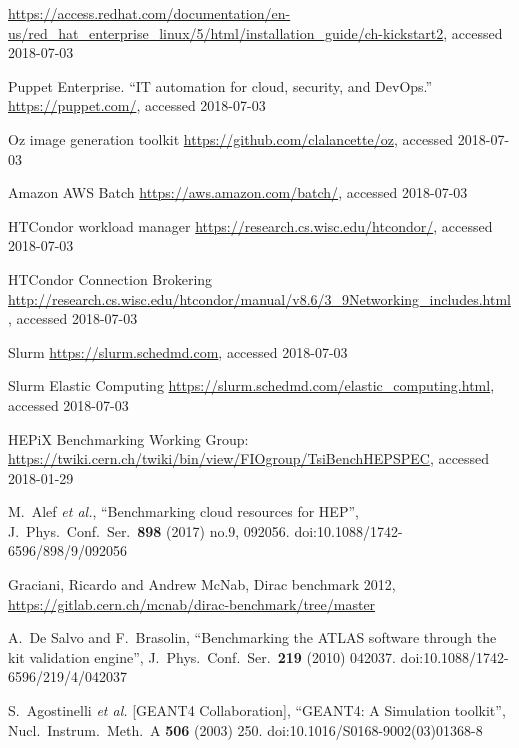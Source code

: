 \begin{thebibliography}{}
\url{https://access.redhat.com/documentation/en-us/red_hat_enterprise_linux/5/html/installation_guide/ch-kickstart2}, accessed 2018-07-03

Puppet Enterprise. ``IT automation for cloud, security, and DevOps.''
\url{https://puppet.com/}, accessed 2018-07-03


Oz image generation toolkit
\url{https://github.com/clalancette/oz}, accessed 2018-07-03

Amazon AWS Batch
\url{https://aws.amazon.com/batch/}, accessed 2018-07-03

HTCondor workload manager
\url{https://research.cs.wisc.edu/htcondor/}, accessed 2018-07-03

HTCondor Connection Brokering
\url{http://research.cs.wisc.edu/htcondor/manual/v8.6/3_9Networking_includes.html}, accessed 2018-07-03

  Slurm
  \url{https://slurm.schedmd.com}, accessed 2018-07-03
    
Slurm Elastic Computing
\url{https://slurm.schedmd.com/elastic_computing.html}, accessed 2018-07-03


 HEPiX Benchmarking Working Group:
\url{https://twiki.cern.ch/twiki/bin/view/FIOgroup/TsiBenchHEPSPEC}, accessed 2018-01-29


M.~Alef {\it et al.},
``Benchmarking cloud resources for HEP'',
J.\ Phys.\ Conf.\ Ser.\  {\bf 898} (2017) no.9,  092056.
doi:10.1088/1742-6596/898/9/092056

Graciani, Ricardo and Andrew McNab, Dirac benchmark 2012, 
\url{https://gitlab.cern.ch/mcnab/dirac-benchmark/tree/master}

A.~De Salvo and F.~Brasolin,
``Benchmarking the ATLAS software through the kit validation engine'',
J.\ Phys.\ Conf.\ Ser.\  {\bf 219} (2010) 042037.
doi:10.1088/1742-6596/219/4/042037

S.~Agostinelli {\it et al.} [GEANT4 Collaboration],        
``GEANT4: A Simulation toolkit'',                          
Nucl.\ Instrum.\ Meth.\ A {\bf 506} (2003) 250.            
doi:10.1016/S0168-9002(03)01368-8                          


\end{thebibliography}

